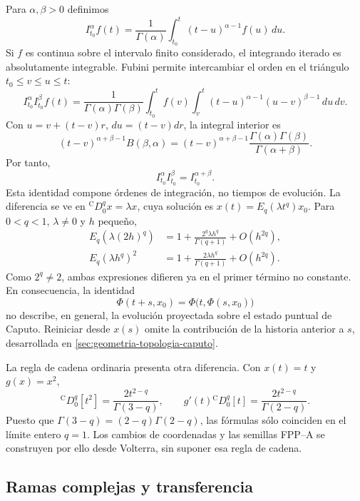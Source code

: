 Para $\alpha,\beta>0$ definimos
\[
 I_{t_0}^{\alpha}f(t)=\frac1{\Gamma(\alpha)}
 \int_{t_0}^t(t-u)^{\alpha-1}f(u)\,du.
\]
Si $f$ es continua sobre el intervalo finito considerado, el integrando
iterado es absolutamente integrable. Fubini permite intercambiar el orden
en el triángulo $t_0\le v\le u\le t$:
\[
 I_{t_0}^\alpha I_{t_0}^\beta f(t)=
 \frac1{\Gamma(\alpha)\Gamma(\beta)}
 \int_{t_0}^t f(v)\int_v^t
 (t-u)^{\alpha-1}(u-v)^{\beta-1}\,du\,dv.
\]
Con $u=v+(t-v)r$, $du=(t-v)dr$, la integral interior es
\[
 (t-v)^{\alpha+\beta-1}B(\beta,\alpha)
 =(t-v)^{\alpha+\beta-1}
 \frac{\Gamma(\alpha)\Gamma(\beta)}{\Gamma(\alpha+\beta)}.
\]
Por tanto,
\begin{equation}
 I_{t_0}^\alpha I_{t_0}^\beta=I_{t_0}^{\alpha+\beta}.
 \label{eq:library-order-semigroup}
\end{equation}
Esta identidad compone órdenes de integración, no tiempos de evolución.
La diferencia se ve en ${}^{\mathrm C}D_0^q x=\lambda x$, cuya solución
es $x(t)=E_q(\lambda t^q)x_0$. Para $0<q<1$, $\lambda\ne0$ y $h$ pequeño,
\begin{align*}
 E_q(\lambda(2h)^q)&=1+\frac{2^q\lambda h^q}{\Gamma(q+1)}+O(h^{2q}),\\
 E_q(\lambda h^q)^2&=1+\frac{2\lambda h^q}{\Gamma(q+1)}+O(h^{2q}).
\end{align*}
Como $2^q\ne2$, ambas expresiones difieren ya en el primer término no
constante. En consecuencia, la identidad
\begin{equation}
 \Phi(t+s,x_0)=\Phi\bigl(t,\Phi(s,x_0)\bigr)
 \label{eq:library-false-time-semigroup}
\end{equation}
no describe, en general, la evolución proyectada sobre el estado puntual de
Caputo. Reiniciar desde $x(s)$ omite la contribución de la historia anterior
a $s$, desarrollada en \cref{sec:geometria-topologia-caputo}.

La regla de cadena ordinaria presenta otra diferencia. Con $x(t)=t$ y
$g(x)=x^2$,
\[
 {}^{\mathrm C}D_0^q[t^2]=\frac{2t^{2-q}}{\Gamma(3-q)},\qquad
 g'(t){}^{\mathrm C}D_0^q[t]=\frac{2t^{2-q}}{\Gamma(2-q)}.
\]
Puesto que $\Gamma(3-q)=(2-q)\Gamma(2-q)$, las fórmulas sólo coinciden
en el límite entero $q=1$. Los cambios de coordenadas y las semillas FPP--A
se construyen por ello desde Volterra, sin suponer esa regla de cadena.

\subsection{Ramas complejas y transferencia}

